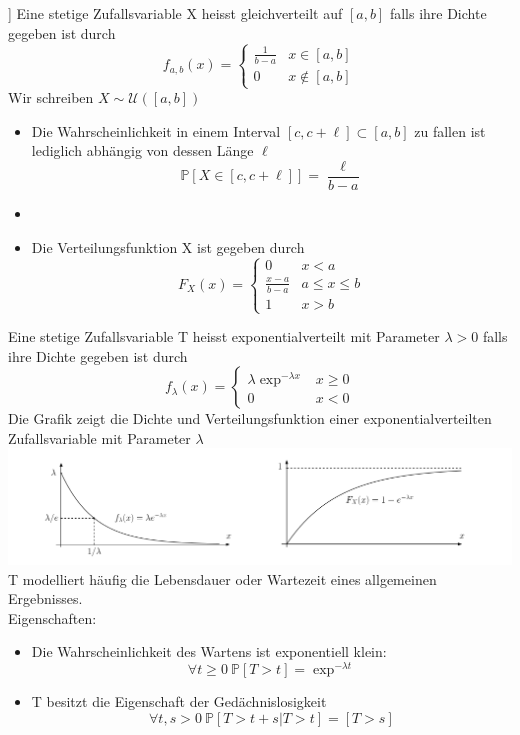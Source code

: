 \Def[3.27 Gleichverteilung auf [a.b]] \newline
Eine stetige Zufallsvariable X heisst gleichverteilt auf \([a,b]\) falls ihre Dichte gegeben ist durch \[ f_{a,b}(x) = \begin{cases}
    \frac{1}{b-a} & x \in [a,b] \\
    0 & x \notin [a,b]
\end{cases}\]
Wir schreiben \(X \sim \mathcal{U}([a,b])\) \newline
\Bem[3.27A]
\begin{itemize}
    \item Die Wahrscheinlichkeit in einem Interval \( [c, c + \ell] \subset [a,b]\) zu fallen ist lediglich abhängig von dessen Länge \( \ell\) \[\mathbb{P}[X \in [c, c + \ell ]] = \frac{\ell}{b-a}\]
    \item 
    \item Die Verteilungsfunktion X ist gegeben durch \[ F_X(x) = \begin{cases}
        0 & x < a \\
        \frac{x-a}{b-a} & a \leq x \leq b \\
        1 & x > b
    \end{cases}\]
\end{itemize}
 \newline
Eine stetige Zufallsvariable T heisst exponentialverteilt mit Parameter \( \lambda > 0\) falls ihre Dichte gegeben ist durch
\[ f_\lambda(x) = \begin{cases}
    \lambda \exp ^{-\lambda x } & x \geq 0 \\
    0 & x < 0
\end{cases}\]
\Bem[3.28A]
Die Grafik zeigt die Dichte und Verteilungsfunktion einer exponentialverteilten Zufallsvariable mit Parameter \( \lambda\)
\includegraphics[scale=0.2]{exp_Dichte_Verteilung.png} \\ 
T modelliert häufig die Lebensdauer oder Wartezeit eines allgemeinen Ergebnisses. \\
Eigenschaften: \begin{itemize}
    \item Die Wahrscheinlichkeit des Wartens ist exponentiell klein: \[ \forall t \geq 0 \ \mathbb{P}[T > t] = \exp^{-\lambda t }\]
    \item T besitzt die Eigenschaft der Gedächnislosigkeit \[ \forall t,s > 0 \ \mathbb{P}[T > t + s | T > t] = [T > s]\]
\end{itemize}
